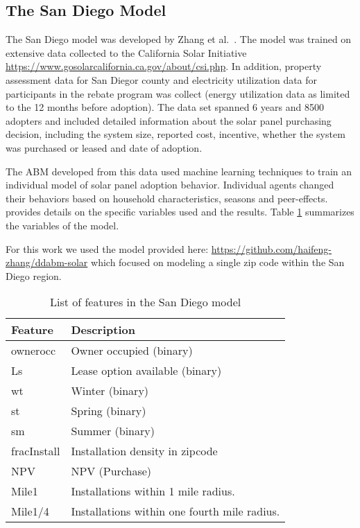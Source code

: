 \subsection{The San Diego Model} \label{san-diego-model}


The San Diego model was developed by Zhang et al.~\cite{zhang16solar}. The model was trained on extensive data collected to the California Solar Initiative \url{https://www.gosolarcalifornia.ca.gov/about/csi.php}. In addition, property assessment data for San Diegor county and electricity utilization data for participants in the rebate program was collect (energy utilization data as limited to the 12 months before adoption). The data set spanned 6 years and 8500 adopters and included detailed information about the solar panel purchasing decision, including the system size, reported cost, incentive, whether the system was purchased or leased and date of adoption.

The ABM developed from this data used machine learning techniques to train an individual model of solar panel adoption behavior. Individual agents changed their behaviors based on household characteristics, seasons and peer-effects. \cite{zhang16solar} provides details on the specific variables used and the results. Table \ref{tab: sandiaFeatures} summarizes the variables of the model.

For this work we used the model provided here: \url{https://github.com/haifeng-zhang/ddabm-solar} which focused on modeling a single zip code within the San Diego region. 

\begin{table}[H]
	\centering
	\caption{List of features in the San Diego model}
	\begin{tabular}{|l|p{6cm}|}
		\hline
		{\bf Feature} & {\bf Description} \\ 
		\hline
		ownerocc & Owner occupied (binary)\\ 
		\hline
		Ls & Lease option available (binary)\\
		\hline
		wt & Winter (binary)\\
		\hline
		st & Spring (binary)\\
		\hline
		sm & Summer (binary)\\
		\hline
		fracInstall & Installation density in zipcode\\
		\hline
		NPV & NPV (Purchase)\\
		\hline
		Mile1 & Installations within 1 mile radius. \\ 
		Mile1/4 & Installations within one fourth mile radius. \\ 
		
		\hline
	\end{tabular}
	\label{tab: sandiaFeatures}
\end{table}

